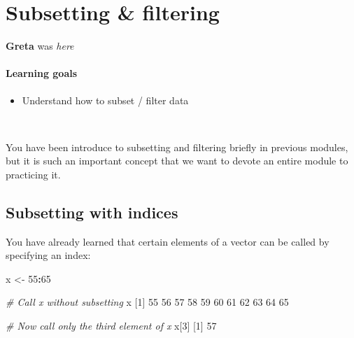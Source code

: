 \documentclass[
]{book}
\newenvironment{Shaded}{\begin{snugshade}}{\end{snugshade}}
\newcommand{\CommentTok}[1]{\textcolor[rgb]{0.56,0.35,0.01}{\textit{#1}}}
\newcommand{\DecValTok}[1]{\textcolor[rgb]{0.00,0.00,0.81}{#1}}
\newcommand{\NormalTok}[1]{#1}
\newcommand{\OtherTok}[1]{\textcolor[rgb]{0.56,0.35,0.01}{#1}}
\newcommand{\SpecialCharTok}[1]{\textcolor[rgb]{0.81,0.36,0.00}{\textbf{#1}}}
\providecommand{\tightlist}{%
  \setlength{\itemsep}{0pt}\setlength{\parskip}{0pt}}
\begin{document}
\chapter{Subsetting \& filtering}\label{subsetting-filtering}

\textbf{Greta} was \emph{here}

\subsubsection*{Learning goals}\label{learning-goals-6}

\begin{itemize}
\tightlist
\item
  Understand how to subset / filter data
\end{itemize}

~

You have been introduce to subsetting and filtering briefly in previous modules, but it is such an important concept that we want to devote an entire module to practicing it.

\section*{Subsetting with indices}\label{subsetting-with-indices}

You have already learned that certain elements of a vector can be called by specifying an index:

\begin{Shaded}
\begin{Highlighting}[]
\NormalTok{x }\OtherTok{\textless{}{-}} \DecValTok{55}\SpecialCharTok{:}\DecValTok{65}

\CommentTok{\# Call x without subsetting}
\NormalTok{x}
\NormalTok{ [}\DecValTok{1}\NormalTok{] }\DecValTok{55} \DecValTok{56} \DecValTok{57} \DecValTok{58} \DecValTok{59} \DecValTok{60} \DecValTok{61} \DecValTok{62} \DecValTok{63} \DecValTok{64} \DecValTok{65}
\end{Highlighting}
\end{Shaded}

\begin{Shaded}
\begin{Highlighting}[]
\CommentTok{\# Now call only the third element of x}
\NormalTok{x[}\DecValTok{3}\NormalTok{]}
\NormalTok{[}\DecValTok{1}\NormalTok{] }\DecValTok{57}
\end{Highlighting}
\end{Shaded}
\end{document}
